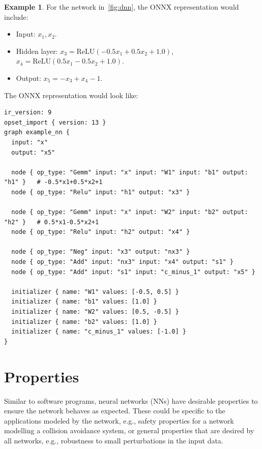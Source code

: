 \documentclass[oneside,11pt,dvipsnames]{book}
\numberwithin{equation}{section}
\theoremstyle{definition}
\newtheorem{example}{Example}[section]
\theoremstyle{remark}
\newcommand{\tvn}[1]{\iftoggle{usecomment}{{\color{red}{[TVN]: #1}}}{}}
\newcommand{\relu}[1]{\mathrm{ReLU}\left(#1\right)}
\begin{document}

\begin{example} For the network in~\autoref{fig:dnn}, the ONNX representation would include:
\begin{itemize}
    \item Input: $x_1, x_2$.
    \item Hidden layer: $x_3 = \relu{-0.5x_1 + 0.5x_2 + 1.0}$, $x_4 = \relu{0.5x_1 - 0.5x_2 + 1.0}$.
    \item Output: $x_5 = -x_3 + x_4 - 1$.
\end{itemize} 
The ONNX representation would look like:

\begin{lstlisting}
ir_version: 9
opset_import { version: 13 }
graph example_nn {
  input: "x"
  output: "x5"

  node { op_type: "Gemm" input: "x" input: "W1" input: "b1" output: "h1" }   # -0.5*x1+0.5*x2+1
  node { op_type: "Relu" input: "h1" output: "x3" }

  node { op_type: "Gemm" input: "x" input: "W2" input: "b2" output: "h2" }   # 0.5*x1-0.5*x2+1
  node { op_type: "Relu" input: "h2" output: "x4" }

  node { op_type: "Neg" input: "x3" output: "nx3" }
  node { op_type: "Add" input: "nx3" input: "x4" output: "s1" }
  node { op_type: "Add" input: "s1" input: "c_minus_1" output: "x5" }

  initializer { name: "W1" values: [-0.5, 0.5] }
  initializer { name: "b1" values: [1.0] }
  initializer { name: "W2" values: [0.5, -0.5] }
  initializer { name: "b2" values: [1.0] }
  initializer { name: "c_minus_1" values: [-1.0] }
}
\end{lstlisting}
\end{example}



\chapter{Properties}\label{chap:properties}

Similar to software programs, neural networks (NNs) have desirable properties to ensure the network behaves as expected. These could be specific to the applications modeled by the network, e.g., safety properties for a network modelling a collision avoidance system, or general properties that are desired by all networks, e.g., robustness to small perturbations in the input data.
\end{document}
